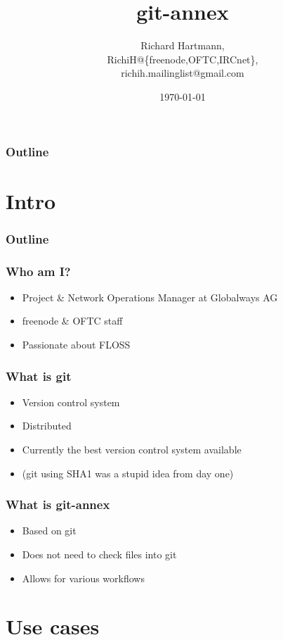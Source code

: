 \documentclass[t]{beamer}
\title{git-annex}
\author{Richard Hartmann,\\
RichiH@\{freenode,OFTC,IRCnet\},\\
richih.mailinglist@gmail.com}
\date{\today}
\begin{document}
\begin{frame}
	\titlepage
\end{frame}

\begin{frame}
	\frametitle{Outline}
	\tableofcontents
\end{frame}


\section{Intro}

\begin{frame}
	\frametitle{Outline}
	\tableofcontents[currentsection]
\end{frame}

\begin{frame}
	\frametitle{Who am I?}
	\begin{itemize}
		\item Project \& Network Operations Manager at Globalways AG
		\item freenode \& OFTC staff
		\item Passionate about FLOSS
	\end{itemize}
\end{frame}

\begin{frame}
	\frametitle{What is git}
	\begin{itemize}
		\item Version control system
		\item Distributed
		\item Currently the best version control system available
		\item (git using SHA1 was a stupid idea from day one)
	\end{itemize}
\end{frame}

\begin{frame}
	\frametitle{What is git-annex}
	\begin{itemize}
		\item Based on git
		\item Does not need to check files into git
		\item Allows for various workflows
	\end{itemize}
\end{frame}


\section{Use cases}
\end{document}
